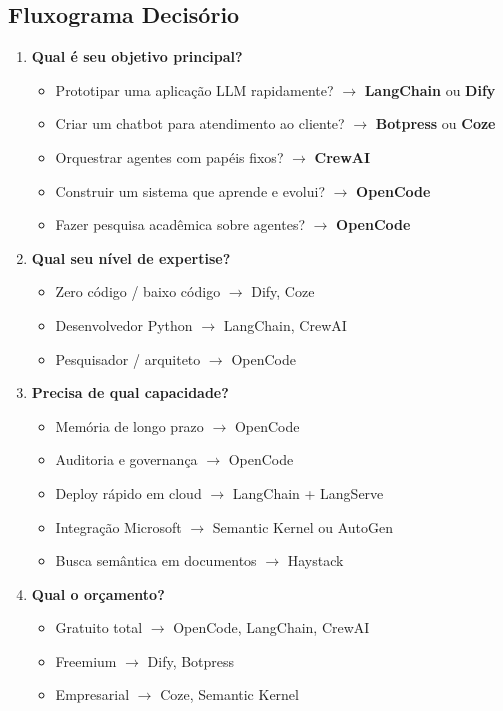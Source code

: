 \subsection{Fluxograma Decisório}
\newcommand{\decisionb}[1]{\textbf{#1}}
\begin{enumerate}
\item \decisionb{Qual é seu objetivo principal?}
\begin{itemize}
\item Prototipar uma aplicação LLM rapidamente?
$\rightarrow$ \textbf{LangChain} ou \textbf{Dify}
\item Criar um chatbot para atendimento ao cliente?
$\rightarrow$ \textbf{Botpress} ou \textbf{Coze}
\item Orquestrar agentes com papéis fixos?
$\rightarrow$ \textbf{CrewAI}
\item Construir um sistema que aprende e evolui?
$\rightarrow$ \textbf{OpenCode}
\item Fazer pesquisa acadêmica sobre agentes?
$\rightarrow$ \textbf{OpenCode}
\end{itemize}
\item \decisionb{Qual seu nível de expertise?}
\begin{itemize}
\item Zero código / baixo código $\rightarrow$ Dify, Coze
\item Desenvolvedor Python $\rightarrow$ LangChain, CrewAI
\item Pesquisador / arquiteto $\rightarrow$ OpenCode
\end{itemize}
\item \decisionb{Precisa de qual capacidade?}
\begin{itemize}
\item Memória de longo prazo $\rightarrow$ OpenCode
\item Auditoria e governança $\rightarrow$ OpenCode
\item Deploy rápido em cloud $\rightarrow$ LangChain + LangServe
\item Integração Microsoft $\rightarrow$ Semantic Kernel ou AutoGen
\item Busca semântica em documentos $\rightarrow$ Haystack
\end{itemize}
\item \decisionb{Qual o orçamento?}
\begin{itemize}
\item Gratuito total $\rightarrow$ OpenCode, LangChain, CrewAI
\item Freemium $\rightarrow$ Dify, Botpress
\item Empresarial $\rightarrow$ Coze, Semantic Kernel
\end{itemize}
\end{enumerate}
